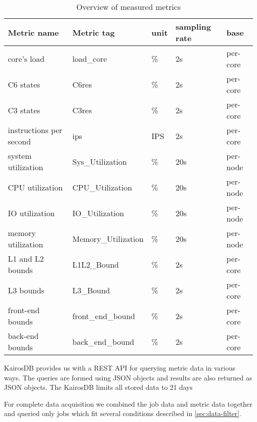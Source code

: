 \begin{table}[ht!]
\centering
\begin{tabular}{lllll}
Metric name             & Metric tag          & unit & sampling rate & base \\ \hline
core's load             & load\_core          & \%  & 2s  & per-core \\ \hline
C6 states               & C6res               & \%  & 2s  & per-core \\ \hline
C3 states               & C3res               & \%  & 2s  & per-core \\ \hline
instructions per second & ips                 & IPS & 2s  & per-core \\ \hline
system utilization      & Sys\_Utilization    & \%  & 20s & per-node \\ \hline
CPU utilization         & CPU\_Utilization    & \%  & 20s & per-node \\ \hline
IO utilization          & IO\_Utilization     & \%  & 20s & per-node \\ \hline
memory utilization      & Memory\_Utilization & \%  & 20s & per-node \\ \hline
L1 and L2 bounds        & L1L2\_Bound         & \%  & 2s  & per-core \\ \hline
L3 bounds               & L3\_Bound           & \%  & 2s  & per-core \\ \hline
front-end bounds        & front\_end\_bound   & \%  & 2s  & per-core \\ \hline
back-end bounds         & back\_end\_bound    & \%  & 2s  & per-core \\ \hline
\end{tabular}
\caption{Overview of measured metrics}
\label{tab:metrics}
\end{table}

KairosDB provides us with a REST API for querying metric data in various ways. The queries are formed using JSON objects and results are also returned as JSON objects. The KairosDB limits all stored data to 21 days

For complete data acquisition we combined the job data and metric data together and queried only jobs which fit several conditions described in \ref{sec:data-filter}.
